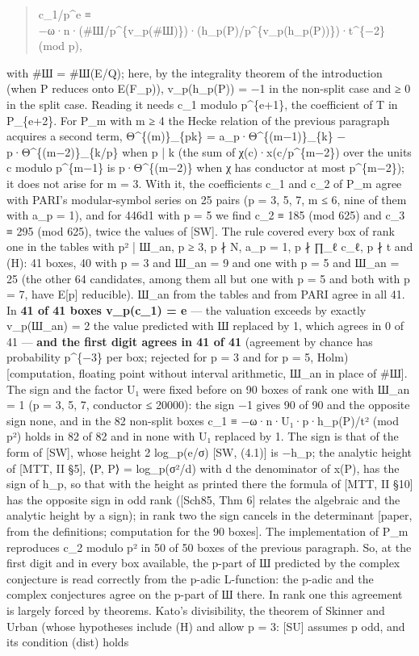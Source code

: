 \documentclass[11pt,a4paper]{article}
\theoremstyle{named}
\begin{document}
\begin{quote}
c\_1/p\textasciicircum{}e ≡ −ω·n·(\#Ш/p\textasciicircum{}\{v\_p(\#Ш)\})·(h\_p(P)/p\textasciicircum{}\{v\_p(h\_p(P))\})·t\textasciicircum{}\{−2\} (mod p),
\end{quote}

with \#Ш = \#Ш(E/Q); here, by the integrality theorem of the introduction (when P reduces onto E(F\_p)), v\_p(h\_p(P)) = −1 in the non-split case and ≥ 0 in the split case. Reading it needs c\_1 modulo p\textasciicircum{}\{e+1\}, the coefficient of T in P\_\{e+2\}. For P\_m with m ≥ 4 the Hecke relation of the previous paragraph acquires a second term, Θ\textasciicircum{}\{(m)\}\_\{pk\} = a\_p·Θ\textasciicircum{}\{(m−1)\}\_\{k\} − p·Θ\textasciicircum{}\{(m−2)\}\_\{k/p\} when p | k (the sum of χ(c)·x(c/p\textasciicircum{}\{m−2\}) over the units c modulo p\textasciicircum{}\{m−1\} is p·Θ\textasciicircum{}\{(m−2)\} when χ has conductor at most p\textasciicircum{}\{m−2\}); it does not arise for m = 3. With it, the coefficients c\_1 and c\_2 of P\_m agree with PARI's modular-symbol series on 25 pairs (p = 3, 5, 7, m ≤ 6, nine of them with a\_p = 1), and for 446d1 with p = 5 we find c\_2 ≡ 185 (mod 625) and c\_3 ≡ 295 (mod 625), twice the values of [SW]. The rule covered every box of rank one in the tables with p² | Ш\_an, p ≥ 3, p ∤ N, a\_p = 1, p ∤ ∏\_ℓ c\_ℓ, p ∤ t and (H): 41 boxes, 40 with p = 3 and Ш\_an = 9 and one with p = 5 and Ш\_an = 25 (the other 64 candidates, among them all but one with p = 5 and both with p = 7, have E[p] reducible). Ш\_an from the tables and from PARI agree in all 41. In \textbf{41 of 41 boxes v\_p(c\_1) = e} — the valuation exceeds by exactly v\_p(Ш\_an) = 2 the value predicted with Ш replaced by 1, which agrees in 0 of 41 — \textbf{and the first digit agrees in 41 of 41} (agreement by chance has probability p\textasciicircum{}\{−3\} per box; rejected for p = 3 and for p = 5, Holm) [computation, floating point without interval arithmetic, Ш\_an in place of \#Ш]. The sign and the factor U₁ were fixed before on 90 boxes of rank one with Ш\_an = 1 (p = 3, 5, 7, conductor ≤ 20000): the sign −1 gives 90 of 90 and the opposite sign none, and in the 82 non-split boxes c\_1 ≡ −ω·n·U₁·p·h\_p(P)/t² (mod p²) holds in 82 of 82 and in none with U₁ replaced by 1. The sign is that of the form of [SW], whose height 2 log\_p(e/σ) [SW, (4.1)] is −h\_p; the analytic height of [MTT, II §5], ⟨P, P⟩ = log\_p(σ²/d) with d the denominator of x(P), has the sign of h\_p, so that with the height as printed there the formula of [MTT, II §10] has the opposite sign in odd rank ([Sch85, Thm 6] relates the algebraic and the analytic height by a sign); in rank two the sign cancels in the determinant [paper, from the definitions; computation for the 90 boxes]. The implementation of P\_m reproduces c\_2 modulo p² in 50 of 50 boxes of the previous paragraph. So, at the first digit and in every box available, the p-part of Ш predicted by the complex conjecture is read correctly from the p-adic L-function: the p-adic and the complex conjectures agree on the p-part of Ш there. In rank one this agreement is largely forced by theorems. Kato's divisibility, the theorem of Skinner and Urban (whose hypotheses include (H) and allow p = 3: [SU] assumes p odd, and its condition (dist) holds 
\end{document}
